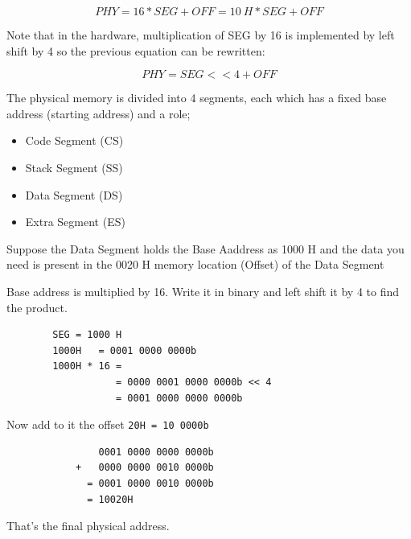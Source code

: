 \documentclass[a4paper]{article}
\begin{document}
\begin{equation}
	PHY = 16*SEG + OFF = 10\ H * SEG + OFF 
\end{equation}

Note that in the hardware, multiplication of SEG by 16 is implemented by left shift by 4 so the previous equation can be rewritten:

\begin{equation}
	PHY = SEG << 4 + OFF
\end{equation}

The physical memory is divided into 4 segments, each which has a fixed base address (starting address) and a role;

\begin{itemize}
	\item Code Segment (CS)
\item Stack Segment (SS)
 \item Data Segment (DS)
 \item Extra Segment (ES)
\end{itemize}
\begin{exmp}
	Suppose the Data Segment holds the Base Aaddress as 1000 H and the data you need is present in the 0020 H memory location (Offset) of the Data Segment
\end{exmp}
\begin{soln}
Base address is multiplied by 16. Write it in binary and left shift it by 4 to find the product.
	\begin{verbatim}
        SEG = 1000 H
        1000H 	= 0001 0000 0000b
        1000H * 16 =
                   = 0000 0001 0000 0000b << 4
                   = 0001 0000 0000 0000b
	\end{verbatim}
	Now add to it the offset \texttt{20H = 10 0000b}
	\begin{verbatim}
                0001 0000 0000 0000b
            +   0000 0000 0010 0000b
              = 0001 0000 0010 0000b
              = 10020H
	\end{verbatim}
	That's the final physical address.
	\qedblack
\end{soln}
\end{document}
